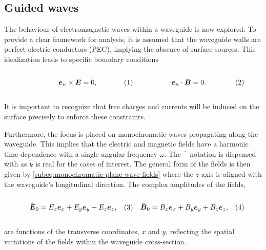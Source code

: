 \documentclass[11pt,a4paper,twoside,openany]{report}
\begin{document}
\subsection{Guided waves}
The behaviour of electromagnetic waves within a waveguide is now explored. To provide a clear framework for analysis, it is assumed that the waveguide walls are perfect electric conductors (PEC), implying the absence of surface sources. This idealization leads to specific boundary conditions\\
\begin{subequations}
    \label{subeq:guided-waves-boundary-conditions}
    \noindent\centering
    \begin{minipage}{0.45\textwidth}
        \begin{align}
            \label{eq:guided-waves-boundary-condition-e}
            \vec e_n \times \vec E &= 0,
        \end{align}
    \end{minipage}
    \hfill
    \begin{minipage}{0.45\textwidth}
        \begin{align}
            \label{eq:guided-waves-boundary-condition-b}
            \vec e_n \cdot \vec B &= 0.
        \end{align}
    \end{minipage}\bigskip
\end{subequations}\\
It is important to recognize that free charges and currents will be induced on the surface precisely to enforce these constraints.

Furthermore, the focus is placed on monochromatic waves propagating along the waveguide. This implies that the electric and magnetic fields have a harmonic time dependence with a single angular frequency $\omega$. The $\hat{\phantom{x}}$ notation is dispensed with as $\hat k$ is real for the cases of interest. The general form of the fields is then given by \cref{subeq:monochromatic-plane-wave-fields} where the $z$-axis is aligned with the waveguide's longitudinal direction. The complex amplitudes of the fields,\\
\begin{subequations}
    \label{subeq:complex-amplitudes}
    \noindent\centering
    \begin{minipage}{0.45\textwidth}
        \begin{align}
            \label{subeq:complex-amplitude-e}
            \hat{\vec E}_0 &= E_x\vec e_x + E_y\vec e_y + E_z\vec e_z,
        \end{align}
    \end{minipage}
    \hfill
    \begin{minipage}{0.45\textwidth}
        \begin{align}
            \label{subeq:complex-amplitude-b}
            \hat{\vec B}_0 &= B_x\vec e_x + B_y\vec e_y + B_z\vec e_z,
        \end{align}
    \end{minipage}\bigskip
\end{subequations}\\
are functions of the transverse coordinates, $x$ and $y$, reflecting the spatial variations of the fields within the waveguide cross-section.
\end{document}

